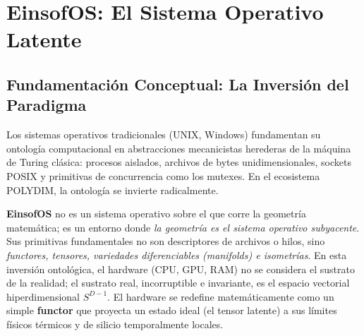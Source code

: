 \chapter{EinsofOS: El Sistema Operativo Latente}
\label{cap:latent_os}

\section{Fundamentación Conceptual: La Inversión del Paradigma}
Los sistemas operativos tradicionales (UNIX, Windows) fundamentan su ontología computacional en abstracciones mecanicistas herederas de la máquina de Turing clásica: procesos aislados, archivos de bytes unidimensionales, sockets POSIX y primitivas de concurrencia como los mutexes. En el ecosistema POLYDIM, la ontología se invierte radicalmente.

\textbf{EinsofOS} no es un sistema operativo sobre el que corre la geometría matemática; es un entorno donde \textit{la geometría es el sistema operativo subyacente}. Sus primitivas fundamentales no son descriptores de archivos o hilos, sino \textit{functores, tensores, variedades diferenciables (manifolds) e isometrías}. En esta inversión ontológica, el hardware (CPU, GPU, RAM) no se considera el sustrato de la realidad; el sustrato real, incorruptible e invariante, es el espacio vectorial hiperdimensional $S^{D-1}$. El hardware se redefine matemáticamente como un simple \textbf{functor} que proyecta un estado ideal (el tensor latente) a sus límites físicos térmicos y de silicio temporalmente locales. 

